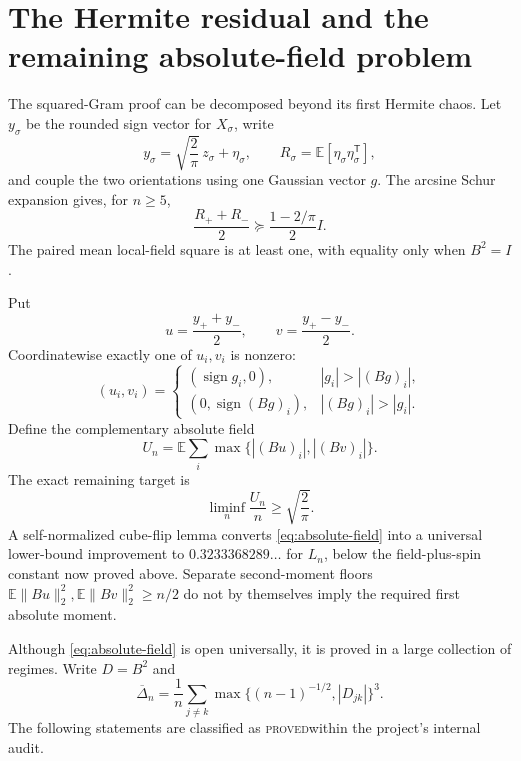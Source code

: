 \documentclass[11pt]{article}
\theoremstyle{definition}
\theoremstyle{remark}
\newcommand{\E}{\mathbb E}
\newcommand{\sgn}{\operatorname{sign}}
\newcommand{\statusproved}{\textcolor{green!40!black}{\textsc{proved}}}
\begin{document}
\section{The Hermite residual and the remaining absolute-field problem}
\label{sec:hermite}

The squared-Gram proof can be decomposed beyond its first Hermite chaos.  Let
$y_\sigma$ be the rounded sign vector for $X_\sigma$, write
\[
 y_\sigma=\sqrt{\frac2\pi}\,z_\sigma+\eta_\sigma,
 \qquad R_\sigma=\E[\eta_\sigma\eta_\sigma^{\mathsf T}],
\]
and couple the two orientations using one Gaussian vector $g$.  The arcsine
Schur expansion gives, for $n\ge5$,
\[
 \frac{R_++R_-}{2}\succeq\frac{1-2/\pi}{2}I.
\]
The paired mean local-field square is at least one, with equality only when
$B^2=I$.

Put
\[
 u=\frac{y_++y_-}{2},\qquad v=\frac{y_+-y_-}{2}.
\]
Coordinatewise exactly one of $u_i,v_i$ is nonzero:
\[
 (u_i,v_i)=
 \begin{cases}
 (\sgn g_i,0),&|g_i|>|(Bg)_i|,\\
 (0,\sgn(Bg)_i),&|(Bg)_i|>|g_i|.
 \end{cases}
\]
Define the complementary absolute field
\[
 U_n=\E\sum_i\max\{|(Bu)_i|,|(Bv)_i|\}.
\]
The exact remaining target is
\begin{equation}\label{eq:absolute-field}
 \liminf_n\frac{U_n}{n}\ge\sqrt{\frac2\pi}.
\end{equation}
A self-normalized cube-flip lemma converts
\eqref{eq:absolute-field} into a universal lower-bound improvement to
$0.3233368289\ldots$ for $L_n$, below the field-plus-spin constant now proved
above.  Separate second-moment floors
$\E\|Bu\|_2^2,\E\|Bv\|_2^2\ge n/2$ do not by themselves imply the required
first absolute moment.

Although \eqref{eq:absolute-field} is open universally, it is proved in a
large collection of regimes.  Write $D=B^2$ and
\[
 \overline\Delta_n=\frac{1}{n}\sum_{j\ne k}
 \max\{(n-1)^{-1/2},|D_{jk}|\}^3.
\]
The following statements are classified as \statusproved within the
project's internal audit.
\end{document}
